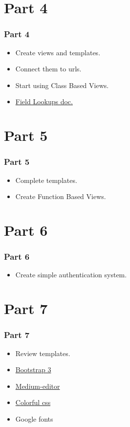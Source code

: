 \documentclass{beamer}
\begin{document}
\section{Part 4}
\begin{frame}[fragile]
	\frametitle{Part 4}
	\begin{itemize}
		\item Create views and templates.
		\item Connect them to urls.
		\item Start using Class Based Views.
		\item \href{https://docs.djangoproject.com/en/2.1/ref/models/querysets/#id4}{Field Lookups doc.}
	\end{itemize}
	
\end{frame}

\section{Part 5}
\begin{frame}
	\frametitle{Part 5}
	\begin{itemize}
		\item Complete templates.
		\item Create Function Based Views.
		
	\end{itemize}
\end{frame}


\section{Part 6}
\begin{frame}
	\frametitle{Part 6}
	\begin{itemize}
		\item Create simple authentication system.
		
	\end{itemize}
\end{frame}

\section{Part 7}
\begin{frame}[fragile]
	\frametitle{Part 7}
	\begin{itemize}
		\item Review templates.
		\item
		\href{https://getbootstrap.com/docs/3.3/getting-started/}{Bootstrap 3}
		
		\item
		\href{https://github.com/yabwe/medium-editor}{Medium-editor}
		
		\item
		\href{https://codepen.io/thapliyalshivam/pen/dvgXVO}{Colorful css}
		\item Google fonts
	\end{itemize}
\end{frame}
\end{document}
